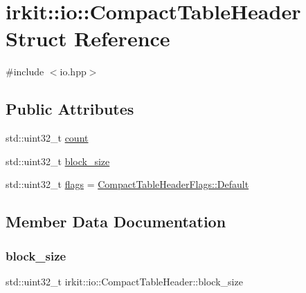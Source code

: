 \hypertarget{structirkit_1_1io_1_1CompactTableHeader}{}\section{irkit\+:\+:io\+:\+:Compact\+Table\+Header Struct Reference}
\label{structirkit_1_1io_1_1CompactTableHeader}


{\ttfamily \#include $<$io.\+hpp$>$}

\subsection*{Public Attributes}
\begin{DoxyCompactItemize}
\item 
std\+::uint32\+\_\+t \mbox{\hyperlink{structirkit_1_1io_1_1CompactTableHeader_ab39c44701590ae4a7598b3fbd62e77ed}{count}}
\item 
std\+::uint32\+\_\+t \mbox{\hyperlink{structirkit_1_1io_1_1CompactTableHeader_a2d54d2496780ffada0569b26f39f0af6}{block\+\_\+size}}
\item 
std\+::uint32\+\_\+t \mbox{\hyperlink{structirkit_1_1io_1_1CompactTableHeader_a5b8e81c7a83231d3e9f7770527268bea}{flags}} = \mbox{\hyperlink{structirkit_1_1io_1_1CompactTableHeaderFlags_a30800f23eaeacbde50aeaef0f4786822}{Compact\+Table\+Header\+Flags\+::\+Default}}
\end{DoxyCompactItemize}


\subsection{Member Data Documentation}
\mbox{\label{structirkit_1_1io_1_1CompactTableHeader_a2d54d2496780ffada0569b26f39f0af6}} 
\subsubsection{\texorpdfstring{block\+\_\+size}{block\_size}}
{\footnotesize\ttfamily std\+::uint32\+\_\+t irkit\+::io\+::\+Compact\+Table\+Header\+::block\+\_\+size}

\mbox{\label{structirkit_1_1io_1_1CompactTableHeader_ab39c44701590ae4a7598b3fbd62e77ed}} 

